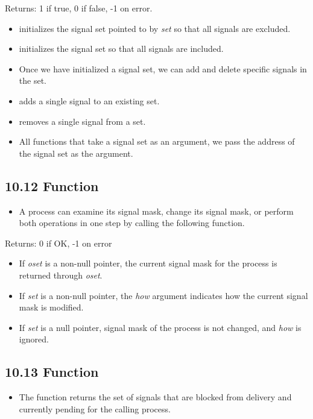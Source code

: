 \documentclass[]{article}
\begin{document}
Returns: 1 if true, 0 if false, -1 on error.

\begin{itemize}
\item {} initializes the signal set pointed to by \emph{set} so
that all signals are excluded.
\item {} initializes the signal set so that all signals are
included.
\item Once we have initialized a signal set, we can add and delete specific
signals in the set.
\item {} adds a single signal to an existing set.
\item {} removes a single signal from a set.
\item All functions that take a signal set as an argument, we pass the address
of the signal set as the argument.
\end{itemize}

\subsection*{10.12  Function}
\begin{itemize}
\item A process can examine its signal mask, change its signal mask, or perform
both operations in one step by calling the following function.
\end{itemize}



Returns: 0 if OK, -1 on error

\begin{itemize}
\item If \emph{oset} is a non-null pointer, the current signal mask for the
process is returned through \emph{oset}.
\item If \emph{set} is a non-null pointer, the \emph{how} argument indicates how
the current signal mask is modified.
\item If \emph{set} is a null pointer, signal mask of the process is not
changed, and \emph{how} is ignored.
\end{itemize}

\subsection*{10.13  Function}
\begin{itemize}
\item The  function returns the set of signals that are blocked
from delivery and currently pending for the calling process.
\end{itemize}
\end{document}
